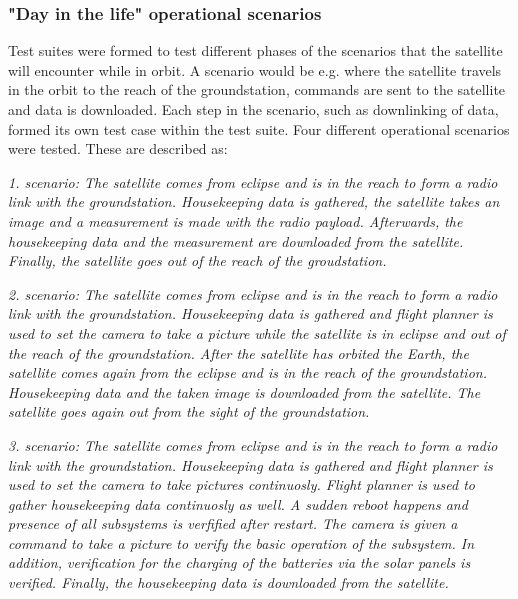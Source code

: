 \documentclass[english,12pt,a4paper,pdftex,elec,utf8]{aaltothesis}
\begin{document}
\subsubsection{"Day in the life" operational scenarios}
Test suites were formed to test different phases of the scenarios that the satellite will encounter while in orbit. A scenario would be e.g. where the satellite travels in the orbit to the reach of the groundstation, commands are sent to the satellite and data is downloaded. Each step in the scenario, such as downlinking of data, formed its own test case within the test suite. 
Four different operational scenarios were tested. These are described as:
\\
\par 
\textit{1. scenario: The satellite comes from eclipse and is in the reach to form a radio link with the groundstation. Housekeeping data is gathered, the satellite takes an image and a measurement is made with the radio payload. Afterwards, the housekeeping data and the measurement are downloaded from the satellite. Finally, the satellite goes out of the reach of the groudstation.}
\\
\par 
\textit{2. scenario: The satellite comes from eclipse and is in the reach to form a radio link with the groundstation. Housekeeping data is gathered and flight planner is used to set the camera to take a picture while the satellite is in eclipse and out of the reach of the groundstation. After the satellite has orbited the Earth, the satellite comes again from the eclipse and is in the reach of the groundstation. Housekeeping data and the taken image is downloaded from the satellite. The satellite goes again out from the sight of the groundstation.}
\\
\par 
\textit{3. scenario: The satellite comes from eclipse and is in the reach to form a radio link with the groundstation. Housekeeping data is gathered and flight planner is used to set the camera to take pictures continuosly. Flight planner is used to gather housekeeping data continuosly as well. A sudden reboot happens and presence of all subsystems is verfified after restart. The camera is given a command to take a picture to verify the basic operation of the subsystem. In addition, verification for the charging of the batteries via the solar panels is verified. Finally, the housekeeping data is downloaded from the satellite.}
\\
\par 
\end{document}
